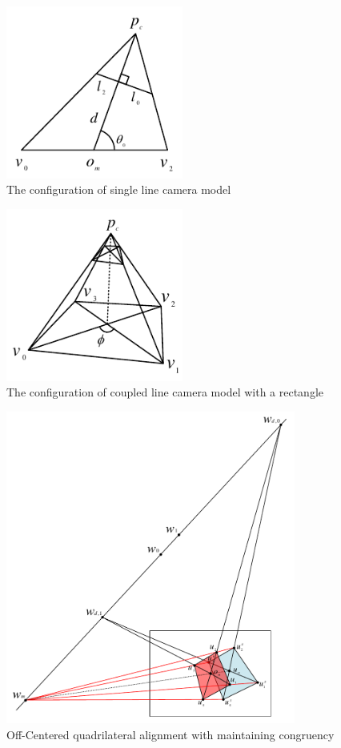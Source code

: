 \documentclass[master,korean,final]{cbnu-ecs}
\begin{document}
\begin{figure}[!ht]
  \centering
	\includegraphics[width=220px]{img/linecamera_cropped.pdf}
  \caption{The configuration of single line camera model}
\label{linecamera}
\end{figure}
\begin{figure}[!ht]
  \centering
	\includegraphics[width=220px]{img/coupled_linecamera_cropped.pdf}
  \caption{The configuration of coupled line camera model with a rectangle}
\label{coupled_linecamera}
\end{figure}
\newpage
\begin{figure}[!ht]
  \centering
	\includegraphics[width=360px]{img/offcentered_cropped.pdf}
  \caption{Off-Centered quadrilateral alignment with maintaining congruency}
\label{offcentered}
\end{figure}
\end{document}
